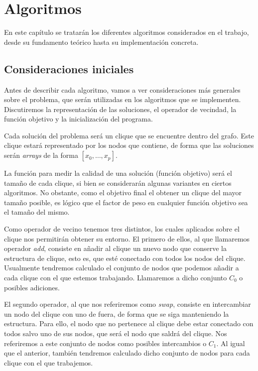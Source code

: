 \chapter{Algoritmos}\label{ch:algoritmos}

En este capítulo se tratarán los diferentes algoritmos considerados en el trabajo, desde su
fundamento teórico hasta su implementación concreta.

\section{Consideraciones iniciales}

Antes de describir cada algoritmo, vamos a ver consideraciones más generales sobre el problema, que serán
utilizadas en los algoritmos que se implementen. Discutiremos la representación de las soluciones, el
operador de vecindad, la función objetivo y la inicialización del programa.

Cada solución del problema será un clique que se encuentre dentro del grafo. Este clique estará representado
por los nodos que contiene, de forma que las soluciones serán \textit{arrays} de la forma $[x_0, \dots, x_p]$.

La función para medir la calidad de una solución (función objetivo) será el tamaño de cada clique, si bien
se considerarán algunas variantes en ciertos algoritmos. No obstante, como el objetivo final el obtener un clique
del mayor tamaño posible, es lógico que el factor de peso en cualquier función objetivo sea el tamaño del mismo.

Como operador de vecino tenemos tres distintos, los cuales aplicados sobre el clique nos permitirán obtener
su entorno. El primero de ellos, al que llamaremos operador \textit{add}, consiste en añadir al clique un
nuevo nodo que conserve la estructura de clique, esto es, que esté conectado con todos los nodos del clique.
Usualmente tendremos calculado el conjunto de nodos que podemos añadir a cada clique con el que estemos trabajando.
Llamaremos a dicho conjunto $C_0$ o posibles adiciones.

El segundo operador, al que nos referiremos como \textit{swap}, consiste en intercambiar un nodo del clique
con uno de fuera, de forma que se siga manteniendo la estructura. Para ello, el nodo que no pertenece al
clique debe estar conectado con todos salvo uno de sus nodos, que será el nodo que saldrá del clique. Nos
referiremos a este conjunto de nodos como posibles intercambios o $C_1$. Al igual que el anterior, también
tendremos calculado dicho conjunto de nodos para cada clique con el que trabajemos.

